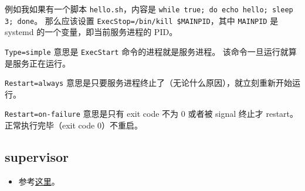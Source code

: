 例如我如果有一个脚本 \verb`hello.sh`，内容是 \verb`while true; do echo hello; sleep 3; done`。 那么应该设置 \verb`ExecStop=/bin/kill $MAINPID`，其中 \verb`MAINPID` 是 systemd 的一个变量，即当前服务进程的 PID。

\verb`Type=simple` 意思是 \verb`ExecStart` 命令的进程就是服务进程。 该命令一旦运行就算是服务正在运行。

\verb`Restart=always` 意思是只要服务进程终止了（无论什么原因），就立刻重新开始运行。

\verb`Restart=on-failure` 意思是只有 exit code 不为 0 或者被 signal 终止才 restart。 正常执行完毕（exit code 0）不重启。

\subsection{supervisor}
\begin{itemize}
\item 参考\href{https://www.digitalocean.com/community/tutorials/how-to-install-and-manage-supervisor-on-ubuntu-and-debian-vps}{这里}。
\end{itemize}

